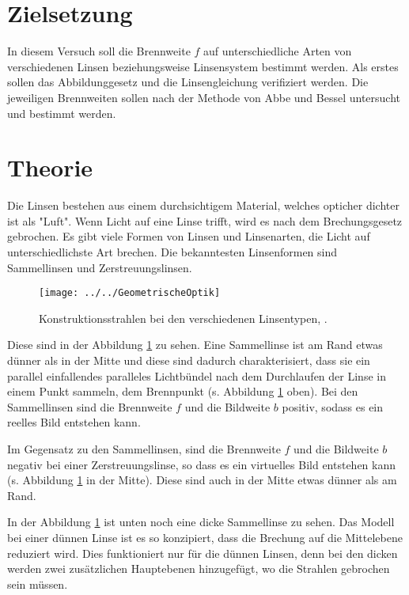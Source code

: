 \section{Zielsetzung}
\label{sec:Zielsetzung}

In diesem Versuch soll die Brennweite $f$ auf unterschiedliche Arten von verschiedenen Linsen beziehungsweise Linsensystem bestimmt werden. Als erstes sollen das Abbildunggesetz und die Linsengleichung verifiziert werden. Die jeweiligen Brennweiten sollen nach der Methode von Abbe und Bessel untersucht und bestimmt werden. 

\section{Theorie}
\label{sec:Theorie}

Die Linsen bestehen aus einem durchsichtigem Material, welches opticher dichter ist als "Luft". Wenn Licht auf eine Linse trifft, wird es nach dem Brechungsgesetz gebrochen. Es gibt viele Formen von Linsen und Linsenarten, die Licht auf unterschiedlichste Art brechen. Die bekanntesten Linsenformen sind Sammellinsen und Zerstreuungslinsen.
\begin{figure}[h!]
	\centering
	\texttt{[image: ../../GeometrischeOptik]}
	\caption{Konstruktionsstrahlen bei den verschiedenen Linsentypen, \cite[1]{anleitung408}.}
	\label{fig:geometrischeoptik}
\end{figure}
Diese sind in der Abbildung \ref{fig:geometrischeoptik} zu sehen. Eine Sammellinse ist am Rand etwas dünner als in der Mitte und diese sind dadurch charakterisiert, dass sie ein parallel einfallendes paralleles Lichtbündel nach dem Durchlaufen der Linse in einem Punkt sammeln, dem Brennpunkt (s. Abbildung \ref{fig:geometrischeoptik} oben). Bei den Sammellinsen sind die Brennweite $f$ und die Bildweite $b$ positiv, sodass es ein reelles Bild entstehen kann. 

Im Gegensatz zu den Sammellinsen, sind die Brennweite $f$ und die Bildweite $b$ negativ bei einer Zerstreuungslinse, so dass es ein virtuelles Bild entstehen kann (s. Abbildung \ref{fig:geometrischeoptik} in der Mitte). Diese sind auch in der Mitte etwas dünner als am Rand.

In der Abbildung \ref{fig:geometrischeoptik} ist unten noch eine dicke Sammellinse zu sehen. Das Modell bei einer dünnen Linse ist es so konzipiert,  dass die Brechung auf die Mittelebene reduziert wird. Dies funktioniert nur für die dünnen Linsen, denn bei den dicken werden zwei zusätzlichen Hauptebenen hinzugefügt, wo die Strahlen gebrochen sein müssen.

